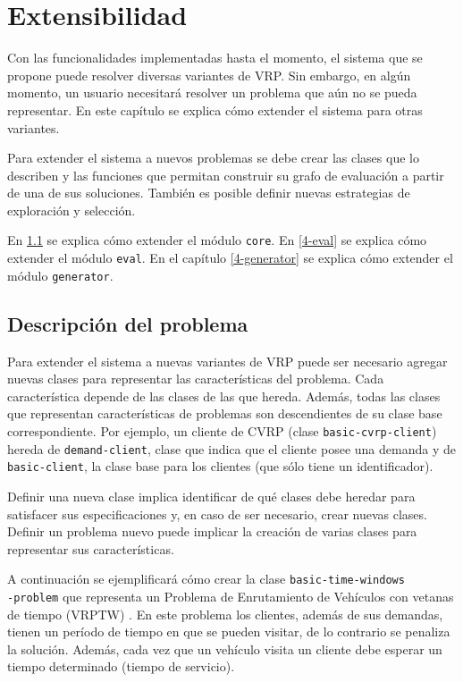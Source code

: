 \chapter{Extensibilidad}\label{chapter:Extension}

Con las funcionalidades implementadas hasta el momento, el sistema que se propone puede resolver diversas variantes de VRP. Sin embargo, en algún momento, un usuario necesitará resolver un problema que aún no se pueda representar. En este capítulo se explica cómo extender el sistema para otras variantes.

Para extender el sistema a nuevos problemas se debe crear las clases que lo describen y las funciones que permitan construir su grafo de evaluación a partir de una de sus soluciones. También es posible definir nuevas estrategias de exploración y selección.

En \ref{4-description} se explica cómo extender el módulo \texttt{core}. En \ref{4-eval} se explica cómo extender el módulo \texttt{eval}. En el capítulo \ref{4-generator} se explica cómo extender el módulo \texttt{generator}.

\section{Descripción del problema}\label{4-description}
Para extender el sistema a nuevas variantes de VRP puede ser necesario agregar nuevas clases para representar las características del problema. Cada característica depende de las clases de las que hereda. Además, todas las clases que representan características de problemas son descendientes de su clase base correspondiente. Por ejemplo, un cliente de CVRP (clase \texttt{basic-cvrp-client}) hereda de \texttt{demand-client}, clase que indica que el cliente posee una demanda y de \texttt{basic-client}, la clase base para los clientes (que sólo tiene un identificador).

Definir una nueva clase implica identificar de qué clases debe heredar para satisfacer sus especificaciones y, en caso de ser necesario, crear nuevas clases. Definir un problema nuevo puede implicar la creación de varias clases para representar sus características.

A continuación se ejemplificará cómo crear la clase \texttt{basic-time-windows\\-problem} que representa un Problema de Enrutamiento de Vehículos con vetanas de tiempo (VRPTW) \cite{VRPTW}. En este problema los clientes, además de sus demandas, tienen un período de tiempo en que se pueden visitar, de lo contrario se penaliza la solución. Además, cada vez que un vehículo visita un cliente debe esperar un tiempo determinado (tiempo de servicio).

